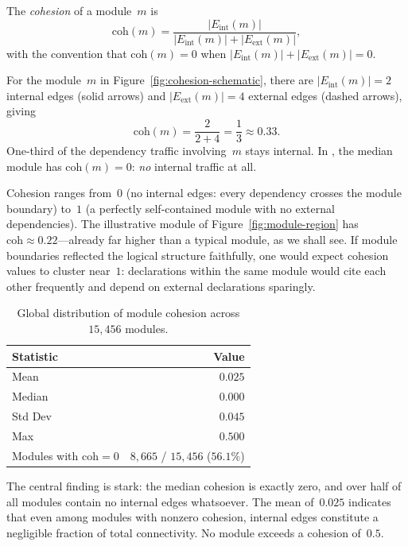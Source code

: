 \begin{definition}
\label{def:cohesion}
The \emph{cohesion} of a module~$m$ is
\[
  \mathrm{coh}(m) = \frac{|E_{\mathrm{int}}(m)|}{|E_{\mathrm{int}}(m)| + |E_{\mathrm{ext}}(m)|},
\]
with the convention that $\mathrm{coh}(m) = 0$ when $|E_{\mathrm{int}}(m)| + |E_{\mathrm{ext}}(m)| = 0$.
\end{definition}

\begin{example}
For the module~$m$ in Figure~\ref{fig:cohesion-schematic}, there are $|E_{\mathrm{int}}(m)| = 2$ internal edges (solid arrows) and $|E_{\mathrm{ext}}(m)| = 4$ external edges (dashed arrows), giving
\[
  \mathrm{coh}(m) = \frac{2}{2+4} = \frac{1}{3} \approx 0.33.
\]
One-third of the dependency traffic involving~$m$ stays internal. In , the median module has $\mathrm{coh}(m) = 0$: \emph{no} internal traffic at all.
\end{example}

Cohesion ranges from~$0$ (no internal edges: every dependency crosses the module boundary) to~$1$ (a perfectly self-contained module with no external dependencies). The illustrative module of Figure~\ref{fig:module-region} has $\mathrm{coh} \approx 0.22$---already far higher than a typical  module, as we shall see. If module boundaries reflected the logical structure faithfully, one would expect cohesion values to cluster near~$1$: declarations within the same module would cite each other frequently and depend on external declarations sparingly.

\begin{table}[ht]
\centering
\caption{Global distribution of module cohesion across $15{,}456$ modules.}
\label{tab:cohesion-global}
\begin{tabular}{lr}
\toprule
Statistic & Value \\
\midrule
Mean       & $0.025$ \\
Median     & $0.000$ \\
Std Dev    & $0.045$ \\
Max        & $0.500$ \\
Modules with $\mathrm{coh} = 0$ & $8{,}665$ / $15{,}456$ ($56.1\%$) \\
\bottomrule
\end{tabular}
\end{table}

The central finding is stark: the median cohesion is exactly zero, and over half of all modules contain no internal edges whatsoever. The mean of~$0.025$ indicates that even among modules with nonzero cohesion, internal edges constitute a negligible fraction of total connectivity. No module exceeds a cohesion of~$0.5$.

